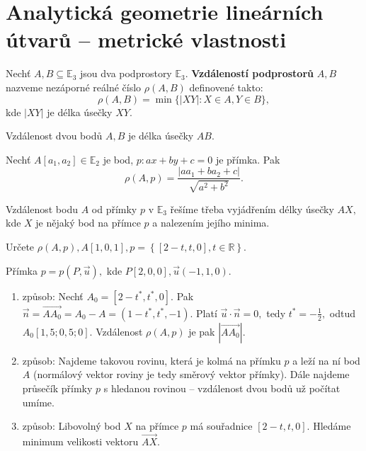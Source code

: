 \section{Analytická geometrie lineárních útvarů -- metrické vlastnosti}
\begin{definition}
    Nechť $A,B\subseteq \mathbb E_3$ jsou dva podprostory $\mathbb E_3$. \textbf{Vzdáleností
    podprostorů} $A,B$ nazveme nezáporné reálné číslo $\rho(A,B)$ definovené takto:
    $$\rho(A,B) = \min \{ |XY|: X\in A, Y\in B \},$$
    kde $|XY|$ je délka úsečky $XY.$
\end{definition}

\begin{veta}
    Vzdálenost dvou bodů $A,B$ je délka úsečky $AB.$
\end{veta}

\begin{veta}
    Nechť $A[a_1,a_2]\in \mathbb E_2$ je bod, $p:ax+by+c=0$ je přímka. Pak
    $$\rho(A,p)=\frac{|aa_1+ba_2+c|}{\sqrt{a^2+b^2} }.$$
\end{veta}

\begin{pozn}
    Vzdálenost bodu $A$ od přímky $p$ v $\mathbb E_3$ řešíme třeba vyjádřením délky úsečky
    $AX,$ kde $X$ je nějaký bod na přímce $p$ a nalezením jejího minima.
\end{pozn}

\begin{priklad}\label{primkaabod}
Určete $\rho(A,p), A[1,0,1], p=\left \{ [2-t,t,0],t \in \mathbb R \right \} $.
\end{priklad}

\begin{reseni}
Přímka $p=p(P,\vec u), $ kde $P[2,0,0],\vec u(-1,1,0).$
\begin{enumerate}[1.]
\item způsob: Nechť $A_0=[2-t^*,t^*,0]$. Pak $\vec n = \overrightarrow{AA_0}=A_0-A=(1-t^*,t^*,-1).$
Platí $\vec u\cdot\vec n=0,$ tedy $t^*=-\frac{1}{2},$ odtud $A_0[1,5;0,5;0].$ Vzdálenost
$\rho(A,p)$ je pak $\left |\overrightarrow{AA_0}\right |.$
\item způsob: Najdeme takovou rovinu, která je kolmá na přímku $p$ a leží na ní bod $A$
(normálový vektor roviny je tedy směrový vektor přímky). Dále najdeme průsečík přímky
$p$ s hledanou rovinou -- vzdálenost dvou bodů už počítat umíme.
\item způsob: Libovolný bod $X$ na přímce $p$ má souřadnice $[2-t,t,0]$. Hledáme
minimum velikosti vektoru $\overrightarrow{AX}.$
\end{enumerate}
\end{reseni}

